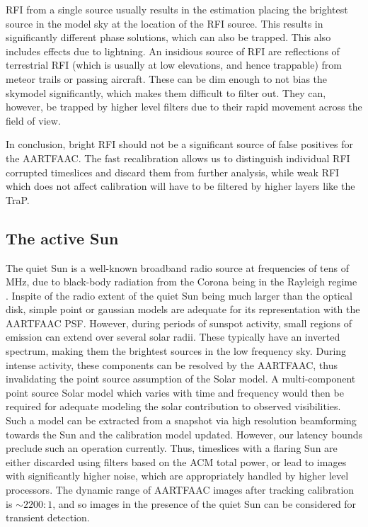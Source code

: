 \documentclass{aa}
\begin{document}
RFI from a single source usually results in the estimation placing the brightest
source in  the model sky  at the  location of the  RFI source.  This  results in
significantly different  phase solutions, which  can also be trapped.  This also
includes effects due  to lightning.  An insidious source  of RFI are reflections
of terrestrial  RFI (which  is usually at  low elevations, and  hence trappable)
from meteor trails or passing aircraft.  These can be dim enough to not bias the
skymodel significantly,  which makes  them difficult to  filter out.   They can,
however, be trapped  by higher level filters due to  their rapid movement across
the field of view.  

In conclusion, bright RFI should not  be a significant source of false positives
for  the  \mbox{AARTFAAC}.  The  fast  recalibration  allows  us to  distinguish
individual  RFI corrupted  timeslices and  discard them  from  further analysis,
while weak  RFI which does  not affect calibration  will have to be  filtered by
higher layers like the TraP.

\subsection{The active Sun}

The quiet Sun  is a well-known broadband radio source at  frequencies of tens of
MHz, due to black-body radiation from  the Corona being in the Rayleigh regime .
Inspite of the radio extent of the  quiet Sun being much larger than the optical
disk, simple point  or gaussian models are adequate  for its representation with
the  \mbox{AARTFAAC} PSF.  However,  during periods  of sunspot  activity, small
regions of emission can extend over several solar radii. These typically have an
inverted  spectrum, making  them  the  brightest sources  in  the low  frequency
sky.  During  intense  activity,  these   components  can  be  resolved  by  the
\mbox{AARTFAAC},  thus invalidating  the point  source assumption  of  the Solar
model. A  multi-component point  source Solar model  which varies with  time and
frequency would then be required for adequate modeling the solar contribution to
observed visibilities.  Such a model can  be extracted from a  snapshot via high
resolution  beamforming  towards the  Sun  and  the  calibration model  updated.
However,  our  latency  bounds  preclude  such an  operation  currently.   Thus,
timeslices with  a flaring Sun are  either discarded using filters  based on the
ACM total  power, or lead to  images with significantly higher  noise, which are
appropriately  handled  by  higher   level  processors.  The  dynamic  range  of
\mbox{AARTFAAC} images after tracking calibration is $\sim2200:1$, and so images
in the presence of the quiet Sun can be considered for transient detection.
\end{document}
